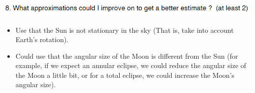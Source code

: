 \documentclass{article}
\begin{document}
\section{}
\includegraphics[scale = 0.8]{projectq8.PNG}
\begin{itemize}
    \item Use that the Sun is not stationary in the sky (That is, take into account Earth's rotation).
    \item Could use that the angular size of the Moon is different from the Sun (for example, if we expect an annular eclipse, we could reduce the angular size of the Moon a little bit, or for a total eclipse, we could increase the Moon's angular size).
\end{itemize}
\end{document}

